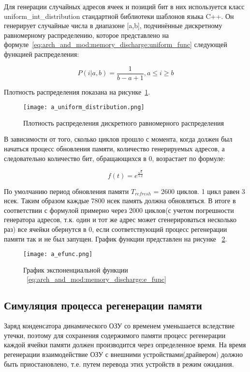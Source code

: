 Для генерации случайных адресов ячеек и позиций бит в них используется класс uniform\_int\_distribution стандартной библиотеки шаблонов языка C++. 
Он генерирует случайные числа в диапазоне [a,b], подчинённые дискретному равномерному распределению, которое представлено на формуле~\ref{eq:arch_and_mod:memory_discharge:uniform_func} следующей функцией распределения:

\begin{equation}
  \label{eq:arch_and_mod:memory_discharge:uniform_func}
  P(i|a,b) = \frac{1}
           {b-a+1}, a \le i \ge b
\end{equation}

Плотность распределения показана на рисунке~\ref{fig:arch_and_mod:modules:uniform_distribution}.

\begin{figure}[ht]
\centering
  \texttt{[image: a\_uniform\_distribution.png]}  
  \caption{Плотность распределения дискретного равномерного распределения}
  \label{fig:arch_and_mod:modules:uniform_distribution}
\end{figure}

В зависимости от того, сколько циклов прошло с момента, когда должен был начаться процесс обновления памяти, количество генерируемых адресов, а следовательно количество бит, обращающихся в 0, возрастает по формуле:

\begin{equation}
  \label{eq:arch_and_mod:memory_discharge:e_func}
  f(t) = e^{\frac{\sqrt{t}}
           {5.2}}
\end{equation}

По умолчанию период обновления памяти $T_{refresh}$ = 2600 циклов. 1 цикл равен 3 нсек. Таким образом каждые 7800 нсек память должна обновляться. В итоге в соответствии с формулой примерно через 2000 циклов(с учетом погрешности генератора адресов, т.к. один и тот же адрес может сгенерироваться несколько раз) все ячейки обернутся в 0, если соответствующий процесс регенерации памяти так и не был запущен. График функции представлен на рисунке ~\ref{fig:arch_and_mod:memory_discharge:efunc_grafic}.

\begin{figure}[ht]
\centering
  \texttt{[image: a\_efunc.png]}  
  \caption{График экспоненциальной функции ~\ref{eq:arch_and_mod:memory_discharge:e_func}}
  \label{fig:arch_and_mod:memory_discharge:efunc_grafic}
\end{figure}

\subsection{Симуляция процесса регенерации памяти}
\label{sub:arch_and_mod:memory_refresh}
Заряд конденсатора динамического ОЗУ со временем уменьшается вследствие утечки, поэтому для сохранения содержимого памяти процесс регенерации каждой ячейки памяти должен производится через определенное время. На время регенерации взаимодействие ОЗУ с внешними устройствами(драйвером) должно быть приостановлено, т.е. путем перевода этих устройств в режим ожидания.

